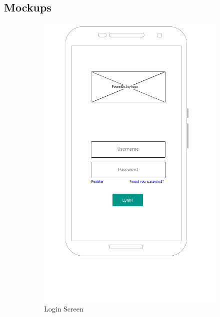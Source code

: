 \documentclass[12pt]{article}
\begin{document}
\subsection{Mockups}

\begin{figure}[h!]
    \centering
    \begin{subfigure}[b]{0.45\textwidth}
        \includegraphics[width=\textwidth]{../UI/LoginScreen}
        \caption{Login Screen}
    \end{subfigure}
    ~
    \begin{subfigure}[b]{0.45\textwidth}

\end{subfigure}
\end{figure}
\end{document}
